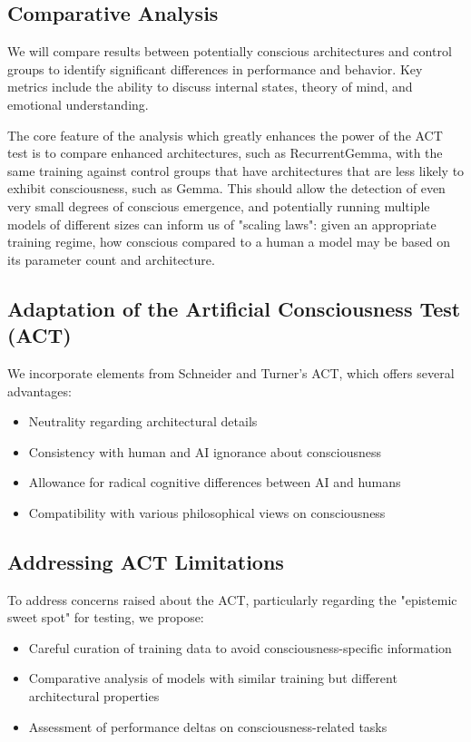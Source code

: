\documentclass{article}
\begin{document}
\subsection{Comparative Analysis}

We will compare results between potentially conscious architectures and control groups to identify significant differences in performance and behavior. Key metrics include the ability to discuss internal states, theory of mind, and emotional understanding.

The core feature of the analysis which greatly enhances the power of the ACT test is to compare enhanced architectures, such as RecurrentGemma, with the same training against control groups that have architectures that are less likely to exhibit consciousness, such as Gemma. This should allow the detection of even very small degrees of conscious emergence, and potentially running multiple models of different sizes can inform us of "scaling laws": given an appropriate training regime, how conscious compared to a human a model may be based on its parameter count and architecture.


\subsection{Adaptation of the Artificial Consciousness Test (ACT)}

We incorporate elements from Schneider and Turner's ACT, which offers several advantages:
\begin{itemize}
    \item Neutrality regarding architectural details
    \item Consistency with human and AI ignorance about consciousness
    \item Allowance for radical cognitive differences between AI and humans
    \item Compatibility with various philosophical views on consciousness
\end{itemize}

\subsection{Addressing ACT Limitations}

To address concerns raised about the ACT, particularly regarding the "epistemic sweet spot" for testing, we propose:

\begin{itemize}
    \item Careful curation of training data to avoid consciousness-specific information
    \item Comparative analysis of models with similar training but different architectural properties
    \item Assessment of performance deltas on consciousness-related tasks
\end{itemize}
\end{document}

